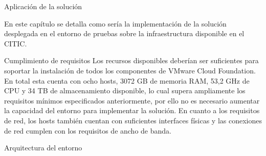 \begin{chapter}{Aplicación de la solución}

En este capítulo se detalla como sería la implementación de la solución desplegada en el entorno de pruebas sobre la infraestructura disponible en el CITIC.

\begin{section}{Cumplimiento de requisitos}
Los recursos disponibles deberían ser suficientes para soportar la instalación de todos los componentes de VMware Cloud Foundation. En total esta cuenta con ocho hosts, 3072 GB de memoria RAM, 53,2 GHz de CPU y 34 TB de almacenamiento disponible, lo cual supera ampliamente los requisitos mínimos especificados anteriormente, por ello no es necesario aumentar la capacidad del entorno para implementar la solución. En cuanto a los requisitos de red, los hosts también cuentan con suficientes interfaces físicas y las conexiones de red cumplen con los requisitos de ancho de banda.
\end{section}

\begin{section}{Arquitectura del entorno}


\end{section}
\end{chapter}
